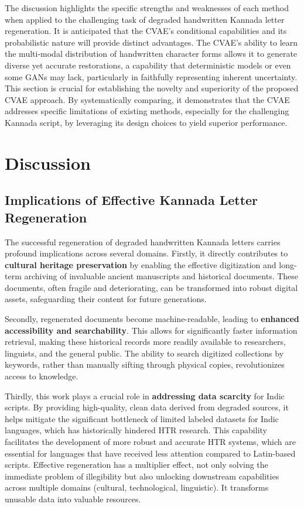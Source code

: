 \documentclass[conference]{IEEEtran}
\begin{document}
The discussion highlights the specific strengths and weaknesses of each method when applied to the challenging task of degraded handwritten Kannada letter regeneration. It is anticipated that the CVAE's conditional capabilities and its probabilistic nature will provide distinct advantages. The CVAE's ability to learn the multi-modal distribution of handwritten character forms allows it to generate diverse yet accurate restorations, a capability that deterministic models or even some GANs may lack, particularly in faithfully representing inherent uncertainty.\cite{Emuru2023} This section is crucial for establishing the novelty and superiority of the proposed CVAE approach. By systematically comparing, it demonstrates that the CVAE addresses specific limitations of existing methods, especially for the challenging Kannada script, by leveraging its design choices to yield superior performance.

\section{Discussion}

\subsection{Implications of Effective Kannada Letter Regeneration}
\justify
The successful regeneration of degraded handwritten Kannada letters carries profound implications across several domains. Firstly, it directly contributes to \textbf{cultural heritage preservation} by enabling the effective digitization and long-term archiving of invaluable ancient manuscripts and historical documents.\cite{Dai2024} These documents, often fragile and deteriorating, can be transformed into robust digital assets, safeguarding their content for future generations.

Secondly, regenerated documents become machine-readable, leading to \textbf{enhanced accessibility and searchability}. This allows for significantly faster information retrieval, making these historical records more readily available to researchers, linguists, and the general public.\cite{Dai2024, Hebbi2023} The ability to search digitized collections by keywords, rather than manually sifting through physical copies, revolutionizes access to knowledge.

Thirdly, this work plays a crucial role in \textbf{addressing data scarcity} for Indic scripts. By providing high-quality, clean data derived from degraded sources, it helps mitigate the significant bottleneck of limited labeled datasets for Indic languages, which has historically hindered HTR research.\cite{Ramesh2024, Hebbi2023} This capability facilitates the development of more robust and accurate HTR systems, which are essential for languages that have received less attention compared to Latin-based scripts. Effective regeneration has a multiplier effect, not only solving the immediate problem of illegibility but also unlocking downstream capabilities across multiple domains (cultural, technological, linguistic). It transforms unusable data into valuable resources.
\end{document}
